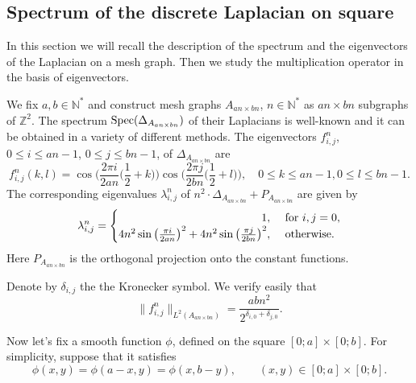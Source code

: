 \documentclass[12pt]{article}
\numberwithin{equation}{section}
\theoremstyle{theorem}
\theoremstyle{definition}
\theoremstyle{remark}
\newcommand{\nat}{\mathbb{N}}
\newcommand{\integ}{\mathbb{Z}}
\newcommand{\spec}{{\rm{Spec}}}
\newcommand{\laplcomp}{\Delta}
\begin{document}
	\subsection{Spectrum of the discrete Laplacian on square}\label{sect_spec_square}
		In this section we will recall the description of the spectrum and the eigenvectors of the Laplacian on a mesh graph.
		Then we study the multiplication operator in the basis of eigenvectors.
		\par 
		We fix $a, b \in \nat^*$ and construct mesh graphs $A_{an \times bn}$, $n \in \nat^*$ as $an \times bn$ subgraphs of $\integ^2$. 
		The spectrum $\spec(\laplcomp_{A_{an \times bn}})$ of their Laplacians is well-known and it can be obtained in a variety of different methods. 
		The eigenvectors $f_{i, j}^{n}$, $0 \leq i \leq an - 1$, $0 \leq j \leq bn - 1$,  of $\laplcomp_{A_{an \times bn}}$ are
		\begin{equation}\label{eq_defn_fij}
			f_{i, j}^{n}(k, l) = 
			 \cos \Big( \frac{2 \pi i}{2 a n} \Big( \frac{1}{2} + k \Big) \Big)
			 \cos \Big( \frac{2 \pi j}{2 b n} \Big( \frac{1}{2} + l \Big) \Big), 
			 \quad
			 0 \leq k \leq an - 1, 0 \leq l \leq bn - 1.
		\end{equation}
		The corresponding eigenvalues $\lambda^{n}_{i, j}$ of $n^2 \cdot \laplcomp_{A_{an \times bn}} + P_{A_{an \times bn}}$ are given by
		\begin{equation}\label{eq_eigenval_sq}
			\lambda^{n}_{i, j} = 
			\begin{cases} 
				\hfill 1, & \text{ for } i, j = 0, \\
				\hfill 4 n^2 \sin  \big( \frac{\pi i}{2 a n} \big)^2 + 4 n^2 \sin  \big( \frac{\pi j}{2 b n} \big)^2, & \text{ otherwise.}
 			\end{cases}
		\end{equation}
		Here $P_{A_{an \times bn}}$ is the orthogonal projection onto the constant functions.
		\par 
		Denote by $\delta_{i,j}$ the the Kronecker symbol.
		We verify  easily that
		\begin{equation}\label{eq_norm_fij_n}
			\big \| f_{i, j}^{n} \big \|_{L^2(A_{an \times bn})} = \frac{abn^2}{2^{\delta_{i, 0} + \delta_{j, 0}}}.
		\end{equation}
		\par 	
		Now let's fix a smooth function $\phi$, defined on the square $[0; a] \times [0; b]$. 
		For simplicity, suppose that it satisfies 
		\begin{equation}\label{eq_symm_phi}
			\phi(x, y) = \phi(a-x, y) = \phi(x, b- y), \qquad (x, y) \in [0; a] \times [0; b].
		\end{equation}
\end{document}
